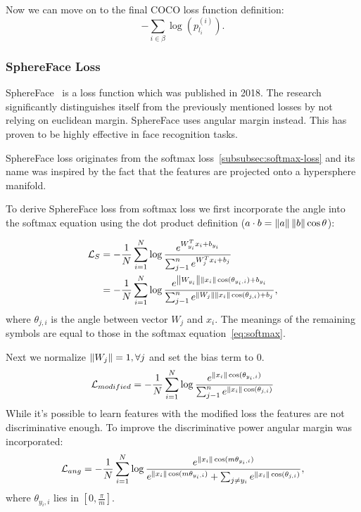 Now we can move on to the final COCO loss function definition:
\begin{equation}
    - \sum_{i \in \beta} \log \left( p_{l_i}^{(i)} \right).
\end{equation}

\subsubsection{SphereFace Loss}\label{subsubsec:sphereface-loss}
SphereFace~\cite{SphereFace} is a loss function which was published in 2018.
The research significantly distinguishes itself from the previously mentioned losses by not relying on euclidean margin.
SphereFace uses angular margin instead.
This has proven to be highly effective in face recognition tasks.

SphereFace loss originates from the softmax loss~\ref{subsubsec:softmax-loss} and its name was inspired by the fact
that the features are projected onto a hypersphere manifold.

To derive SphereFace loss from softmax loss we first incorporate the angle into the softmax equation using the dot
product definition ($a \cdot b = \left\lVert a\right\rVert \left\lVert b\right\rVert \cos \theta$):

\begin{align*}
    \mathcal{L}_S &= -\frac{1}{N} \sum_{i=1}^{N} \log \frac{e^{W^T_{y_i} x_{i} + b_{y_i}}}
    {\sum_{j-1}^{n} e^{W^T_{j} x_{i} + b_{j}}} \\
    &= -\frac{1}{N} \sum_{i=1}^{N} \log \frac{e^{\left\lVert W_{y_i}\right\rVert \left\lVert x_i\right\rVert \cos(\theta_{y_i,i}) + b_{y_i}}}
    {\sum_{j-1}^{n} e^{\left\lVert W_j\right\rVert \left\lVert x_{i}\right\rVert \cos(\theta_{j,i}) + b_{j}}},
\end{align*}
where $\theta_{j,i}$ is the angle between vector $W_j$ and $x_i$.
The meanings of the remaining symbols are equal to those in the softmax equation~\ref{eq:softmax}.


Next we normalize $\left\lVert W_j\right\rVert = 1, \forall j$ and set the bias term to 0.
\begin{equation}
    \label{eq:softmaxmod}
    \mathcal{L}_{modified} = -\frac{1}{N} \sum_{i=1}^{N} \log \frac{e^{\left\lVert x_i\right\rVert \cos(\theta_{y_i,i})}}
    {\sum_{j-1}^{n} e^{\left\lVert x_{i}\right\rVert \cos(\theta_{j,i})}}
\end{equation}
While it's possible to learn features with the modified loss the features are not discriminative enough.
To improve the discriminative power angular margin was incorporated:
\begin{equation}
    \label{eq:ang}
    \mathcal{L}_{ang} = -\frac{1}{N} \sum_{i=1}^{N} \log \frac{e^{\left\lVert x_i\right\rVert \cos(m\theta_{y_i,i})}}
    {e^{\left\lVert x_i\right\rVert \cos(m\theta_{y_i,i})} + \sum_{j \neq y_i} e^{\left\lVert x_{i}\right\rVert \cos(\theta_{j,i})}},
\end{equation}
where $\theta_{y_i,i}$ lies in $\left[ 0, \frac{\pi}{m} \right]$.

